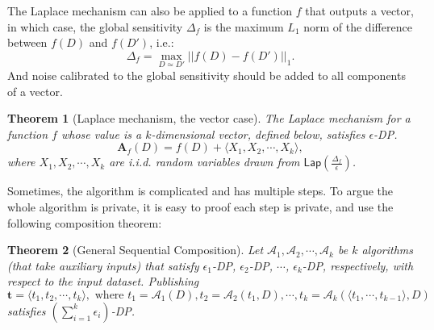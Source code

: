 \documentclass{article}
\renewcommand{\AA}{\mathbf{A}}
\newtheorem{theorem}{Theorem}
\newtheorem{proposition}{Proposition}
\newcommand{\Data}{\ensuremath{D}\xspace}
\begin{document}
The Laplace mechanism can also be applied to a function $f$ that outputs a vector, in which case, the global sensitivity $\Delta_f$ is the maximum $L_1$ norm of the difference between $f(D)$ and $f(D')$, i.e.:
\begin{equation}\label{eq:globalsensitivity1}
\Delta_f  = \max_{D\simeq D'} ||f(D) - f(D')||_1.
\end{equation}
And noise calibrated to the global sensitivity should be added to all components of a vector.


\begin{theorem}[Laplace mechanism, the vector case]\label{thm:lap_vector}
	The Laplace mechanism for a function $f$ whose value is a $k$-dimensional vector, defined below, satisfies $\epsilon$-DP.
	\begin{equation*}
	\AA_f(D)  = f(D)+\langle X_1, X_2, \cdots, X_k\rangle,
	\end{equation*}
	where $X_1, X_2, \cdots, X_k$ are i.i.d. random variables drawn from
	$\mathsf{Lap}\left(\frac{\Delta_f}{\epsilon}\right)$.
\end{theorem}


Sometimes, the algorithm is complicated and has multiple steps.  To argue the whole algorithm is private, it is easy to proof each step is private, and use the following composition theorem:

\begin{theorem}[General Sequential Composition] \label{lem:gscomp}
	Let $\mathcal{A}_1, \mathcal{A}_2, \cdots, \mathcal{A}_k$ be $k$
	algorithms (that take auxiliary inputs) that satisfy $\epsilon_1$-DP, $\epsilon_2$-DP, $\cdots$,
	$\epsilon_k$-DP, respectively, with respect to the input dataset.
	Publishing %
	$$\mathbf{t} = \langle t_1,t_2,\cdots,t_k\rangle, \mbox{ where } t_1=\mathcal{A}_1(D), t_2=\mathcal{A}_2(t_1,D), \cdots, t_k=\mathcal{A}_k(\langle t_1,\cdots,t_{k-1}\rangle,\Data)$$
	satisfies $(\sum_{i=1}^k \epsilon_i)$-DP.
\end{theorem}

\end{document}
